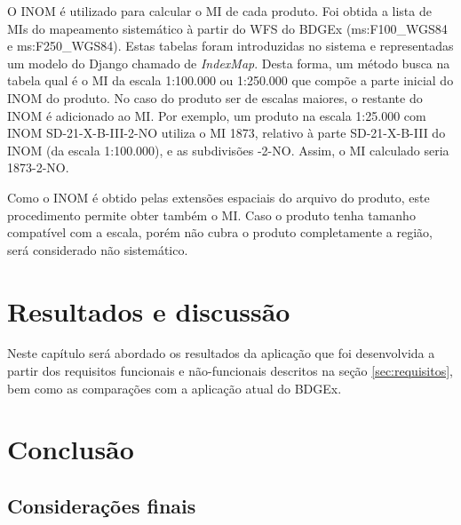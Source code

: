 O INOM é utilizado para calcular o MI de cada produto. Foi obtida a lista de MIs do mapeamento sistemático à partir do WFS do BDGEx (ms:F100\_WGS84 e ms:F250\_WGS84). Estas tabelas foram introduzidas no sistema e representadas um modelo do Django chamado de \textit{IndexMap}. Desta forma, um método busca na tabela qual é o MI da escala 1:100.000 ou 1:250.000 que compõe a parte inicial do INOM do produto. No caso do produto ser de escalas maiores, o restante do INOM é adicionado ao MI. Por exemplo, um produto na escala 1:25.000 com INOM SD-21-X-B-III-2-NO utiliza o MI 1873, relativo à parte SD-21-X-B-III do INOM (da escala 1:100.000), e as subdivisões -2-NO. Assim, o MI calculado seria 1873-2-NO. 

Como o INOM é obtido pelas extensões espaciais do arquivo do produto, este procedimento permite obter também o MI. Caso o produto tenha tamanho compatível com a escala, porém não cubra o produto completamente a região, será considerado não sistemático.




\chapter{Resultados e discussão}


Neste capítulo será abordado os resultados da aplicação que foi desenvolvida a partir dos requisitos funcionais e não-funcionais descritos na seção \ref{sec:requisitos}, bem como as comparações com a aplicação atual do BDGEx.



\chapter{Conclusão}

\section{Considerações finais}


